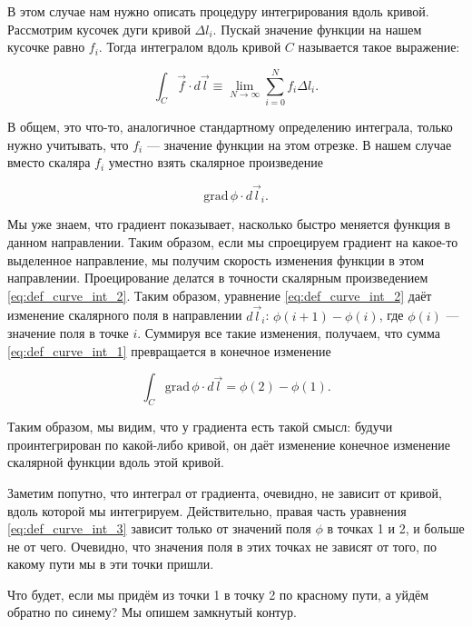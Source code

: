 \documentclass[11pt,a4paper]{article}
\numberwithin{equation}{section}
\newcommand{\grad}{\mathrm{grad}\,}
\begin{document}
В этом случае нам нужно описать процедуру интегрирования вдоль
кривой. Рассмотрим кусочек дуги кривой $\Delta l_i$. Пускай значение функции
на нашем кусочке равно $f_i$. Тогда интегралом вдоль кривой $C$
называется такое выражение:

\begin{equation}
  \label{eq:def_curve_int_1}
  \int_C  \vec{f} \cdot d\vec{l} \equiv \lim_{N\to \infty} \sum_{i=0}^N f_i \Delta l_i. 
\end{equation}

В общем, это что-то, аналогичное стандартному определению интеграла,
только нужно учитывать, что $f_i$ --- значение функции на этом
отрезке. В нашем случае вместо скаляра $f_i$ уместно взять скалярное
произведение 

\begin{equation}
  \label{eq:def_curve_int_2}
  \grad \phi \cdot d\vec{l}_i.
\end{equation}

Мы уже знаем, что градиент показывает, насколько быстро меняется
функция в данном направлении. Таким образом, если мы спроецируем
градиент на какое-то выделенное направление, мы получим скорость
изменения функции в этом направлении. Проецирование делатся в точности
скалярным произведением \eqref{eq:def_curve_int_2}. Таким образом,
уравнение \eqref{eq:def_curve_int_2} даёт изменение скалярного поля в
направлении $d\vec{l}_i$: $\phi(i+1) - \phi(i)$, где $\phi(i)$ ---
значение поля в точке $i$. Суммируя все такие изменения, получаем, что
сумма \eqref{eq:def_curve_int_1} превращается в конечное изменение 

\begin{equation}
  \label{eq:def_curve_int_3}
  \int_C \grad \phi \cdot d\vec{l} = \phi(2) - \phi(1).
\end{equation}

Таким образом, мы видим, что у градиента есть такой смысл: будучи
проинтегрирован по какой-либо кривой, он даёт изменение конечное
изменение скалярной функции вдоль этой кривой. 

Заметим попутно, что интеграл от градиента, очевидно, не зависит от
кривой, вдоль которой мы интегрируем. Действительно, правая часть
уравнения \eqref{eq:def_curve_int_3} зависит только от значений поля
$\phi$ в точках 1 и 2, и больше не от чего. Очевидно, что значения
поля в этих точках не зависят от того, по какому пути мы в эти точки
пришли. 

Что будет, если мы придём из точки 1 в точку 2 по красному пути, а
уйдём обратно по синему? Мы опишем замкнутый контур. 
\end{document}
